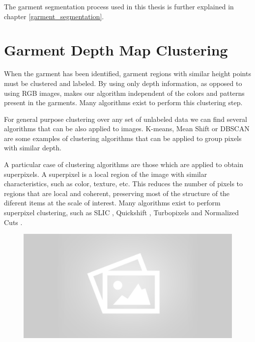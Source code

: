 The garment segmentation process used in this thesis is further explained in chapter \ref{garment_segmentation}.

\section{Garment Depth Map Clustering}
When the garment has been identified, garment regions with similar height points must be clustered and labeled. By using only depth information, as opposed to using RGB images, makes our algorithm independent of the colors and patterns present in the garments. Many algorithms exist to perform this clustering step.

For general purpose clustering over any set of unlabeled data we can find several algorithms that can be also applied to images. K-means, Mean Shift or DBSCAN are some examples of clustering algorithms that can be applied to group pixels with similar depth.

A particular case of clustering algorithms are those which are applied to obtain superpixels. A superpixel  is a local region of the image with similar characteristics, such as color, texture, etc. This reduces the number of pixels to regions that are local and coherent, preserving most of the structure of the diferent items at the scale of interest. Many algorithms exist to perform superpixel clustering, such as SLIC , Quickshift , Turbopixels  and Normalized Cuts .

\begin{figure}[thpb]
    \centering
    \includegraphics[width=0.8
    \textwidth]{figures/placeholder2.png}
    \caption{}
    \label{fig:generic_superpixels}
\end{figure}

 \comment{[...]}

